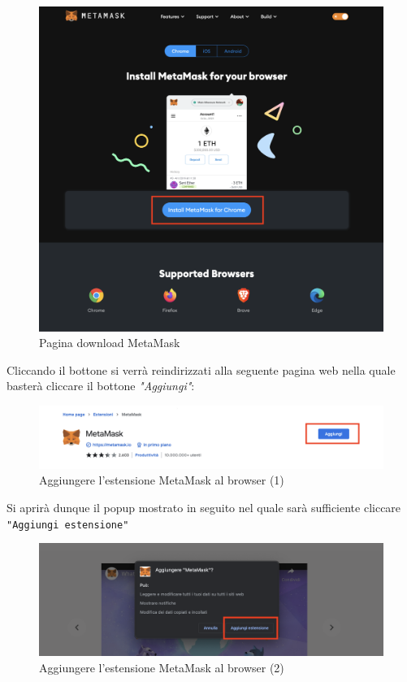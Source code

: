  \begin{figure}[H]
    \centering
    \includegraphics[scale=0.3]{immagini/MetaMask/install-MetaMask.png}
    \caption{Pagina download MetaMask}
\end{figure}

Cliccando il bottone si verrà reindirizzati alla seguente pagina web nella quale basterà cliccare il bottone \textit{"Aggiungi"}:

\begin{figure}[H]
    \centering
    \includegraphics[scale=0.3]{immagini/MetaMAsk/MetaMaskExtensionPage.png}
    \caption{Aggiungere l'estensione MetaMask al browser (1)}
\end{figure}

Si aprirà dunque il popup mostrato in seguito nel quale sarà sufficiente cliccare \texttt{"Aggiungi estensione"}


\begin{figure}[H]
    \centering
    \includegraphics[scale=0.3]{immagini/MetaMAsk/AddExtenction.png}
    \caption{Aggiungere l'estensione MetaMask al browser (2)}
\end{figure}


